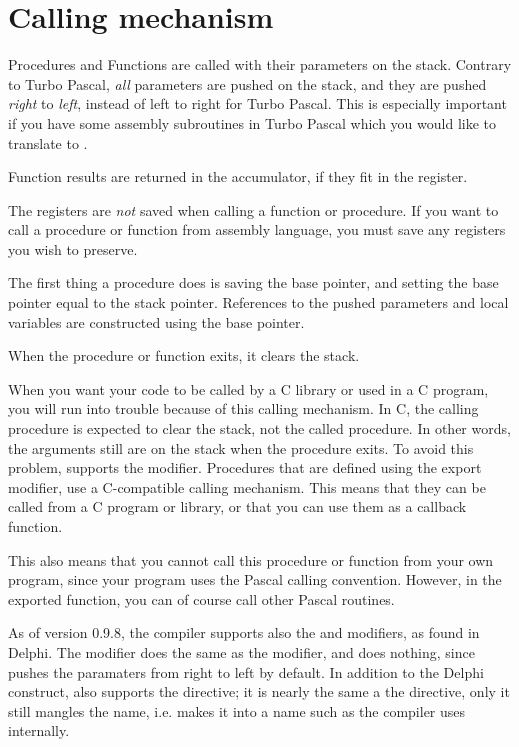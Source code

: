 \documentclass{report}
\begin{document}
\section{Calling mechanism}
\label{se:Calling}
Procedures and Functions are called with their parameters on the stack.
Contrary to Turbo Pascal, {\em all} parameters are pushed on the stack, and
they are pushed {\em right} to {\em left}, instead of left to right for
Turbo Pascal. This is especially important if you have some assembly
subroutines in Turbo Pascal which you would like to translate to \fpc.

Function results are returned in the accumulator, if they fit in the
register.

The registers are {\em not} saved when calling a function or procedure. If
you want to call a procedure or function from assembly language, you must
save any registers you wish to preserve.

The first thing a procedure does is saving the base pointer, and setting the
base pointer equal to the stack pointer. References to the pushed parameters
and local variables are constructed using the base pointer.

When the procedure or function exits, it clears the stack.

When you want your code to be called by a C library or used in a C
program, you will run into trouble because of this calling mechanism. In C,
the calling procedure is expected to clear the stack, not the called
procedure. In other words, the arguments still are on the stack when the
procedure exits. To avoid this problem, \fpc supports the 
modifier. Procedures that are defined using the export modifier, use a
C-compatible calling mechanism. This means that they can be called from a
C program or library, or that you can use them as a callback function.

This also means that you cannot call this procedure or function from your
own program, since your program uses the Pascal calling convention.
However, in the exported function, you can of course call other Pascal
routines.

As of version 0.9.8, the \fpc compiler supports also the  and
 modifiers, as found in Delphi. The  modifier does
the same as the  modifier, and  does nothing, since
\fpc pushes the paramaters from right to left by default.
In addition to the Delphi  construct, \fpc also supports the
 directive; it is nearly the same a the  directive,
only it still mangles the name, i.e. makes it into a name such as the
compiler uses internally.
\end{document}
